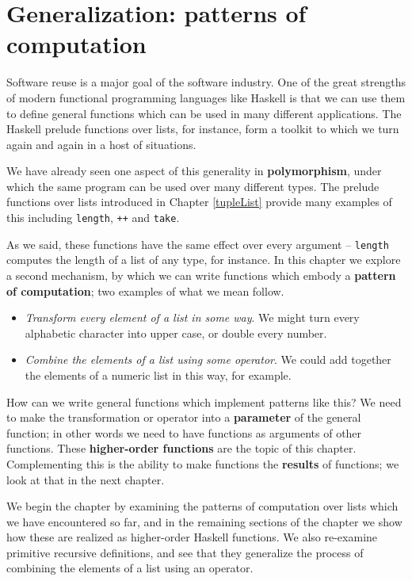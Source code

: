 
\chapter{Generalization: patterns of computation}
\chapstart
\label{patternsGen}

Software reuse is a major goal of the software industry.
One of the great strengths of modern functional programming languages
like Haskell is that we can use them to define
general functions which can be used in many different applications. The Haskell
prelude functions over lists, for instance, 
form a toolkit to which we turn again and again in a host of
situations.

We have already seen one aspect of
this generality in \textbf{polymorphism}, under which the same program can
be used over many different types. The 
prelude functions over lists introduced in Chapter \ref{tupleList} 
provide many examples of this
including \texttt{length}, \texttt{++} and \texttt{take}. 

As we said, these functions have the same effect over every argument --
\texttt{length} computes the length of a list of any type, for instance. In this
chapter we explore a second mechanism, by which we can write functions
which embody a \textbf{pattern of computation}; two examples of what we mean 
follow. 
\begin{itemize}
\item {\em Transform every element of a list in some way}. We might turn every
alphabetic character into upper case, or double every number.
\item {\em Combine the elements of a list using some operator}. We could add
together the elements of a numeric list in this way, for example.
\end{itemize}
How can we write general functions which implement patterns like this? 
We need to make the transformation
or operator into a \textbf{parameter} of the general function; in other
words we need to have functions as arguments of other functions. These 
\textbf{higher-order functions} are
the topic of this chapter.
Complementing this is the ability to make functions the \textbf{results}
of functions; we look at that in the next chapter.

We begin the chapter by examining the patterns of computation
over lists which we have encountered so far, and in the remaining
sections of the chapter we show how these are realized as higher-order
Haskell functions. We also re-examine primitive recursive definitions,
and see that they generalize the process of combining the elements of a
list using an operator. 


